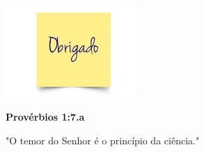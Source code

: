 \documentclass{beamer}
\begin{document}
    \begin{frame}
        \begin{center}
            \includegraphics[width=5cm]{imagens/obrigado.jpg}
        \end{center}
        \begin{center}
            \textbf{Provérbios 1:7.a}
        \end{center}
        \begin{center}
            "O temor do Senhor é o princípio da ciência."
        \end{center}
    \end{frame}
\end{document}

